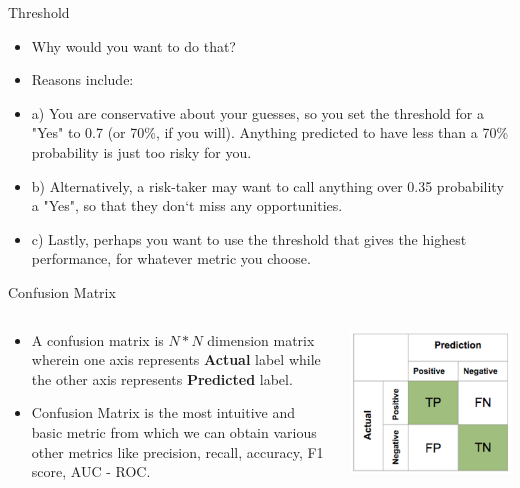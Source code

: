 \documentclass[11pt]{beamer}
\begin{document}
\begin{frame}{Threshold}
	\begin{itemize}
		\item Why would you want to do that? 
		\item Reasons include: 
		\item a) You are conservative about your guesses, so you set the threshold for a "Yes" to 0.7 (or 70\%, if you will). Anything predicted to have less than a 70\% probability is just too risky for you. 
		\item b) Alternatively, a risk-taker may want to call anything over 0.35 probability a "Yes", so that they don`t miss any opportunities. 
		\item c) Lastly, perhaps you want to use the threshold that gives the highest performance, for whatever metric you choose. 
	\end{itemize}
\end{frame}
\begin{frame}{Confusion Matrix}
\begin{columns}[T] %
\begin{column}{.48\textwidth}
        \begin{itemize}
		\item A confusion matrix is $N*N$ dimension matrix wherein one axis represents \textbf{Actual} label while the other axis represents \textbf{Predicted} label.
		\item Confusion Matrix is the most intuitive and basic metric from which we can obtain various other metrics like precision, recall, accuracy, F1 score, AUC - ROC.
        \end{itemize}
\end{column}%
\hfill%
\begin{column}{.48\textwidth}
        \includegraphics[width=\linewidth]{../05-pictures/lesson-4-1_pic_0.png}
\end{column}%
\end{columns}
\end{frame}
\end{document}

